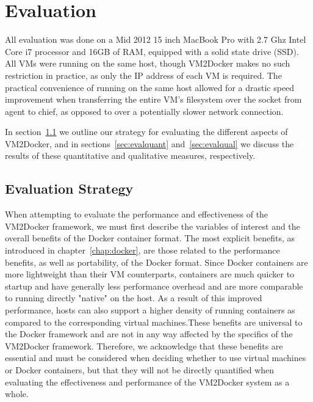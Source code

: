 \chapter{Evaluation}
\label{chap:eval}
All evaluation was done on a Mid 2012 15 inch MacBook Pro with 2.7 Ghz Intel Core i7 processor and 16GB of RAM, equipped with a solid state drive (SSD). All VMs were running on the same host, though VM2Docker makes no such restriction in practice, as only the IP address of each VM is required. The practical convenience of running on the same host allowed for a drastic speed improvement when transferring the entire VM's filesystem over the socket from agent to chief, as opposed to over a potentially slower network connection.

In section~\ref{sec:evalstrat} we outline our strategy for evaluating the different aspects of VM2Docker, and in sections~\ref{sec:evalquant} and~\ref{sec:evalqual} we discuss the results of these quantitative and qualitative measures, respectively.

\section{Evaluation Strategy}
\label{sec:evalstrat}
When attempting to evaluate the performance and effectiveness of the VM2Docker framework, we must first describe the variables of interest and the overall benefits of the Docker container format. The most explicit benefits, as introduced in chapter~\ref{chap:docker}, are those related to the performance benefits, as well as portability, of the Docker format. Since Docker containers are more lightweight than their VM counterparts, containers are much quicker to startup and have generally less performance overhead and are more comparable to running directly "native" on the host. As a result of this improved performance, hosts can also support a higher density of running containers as compared to the corresponding virtual machines.These benefits are universal to the Docker framework and are not in any way affected by the specifics of the VM2Docker framework. Therefore, we acknowledge that these benefits are essential and must be considered when deciding whether to use virtual machines or Docker containers, but that they will not be directly quantified when evaluating the effectiveness and performance of the VM2Docker system as a whole.

